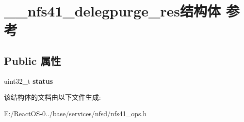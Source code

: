 \hypertarget{struct____nfs41__delegpurge__res}{}\section{\+\_\+\+\_\+nfs41\+\_\+delegpurge\+\_\+res结构体 参考}
\label{struct____nfs41__delegpurge__res}
\subsection*{Public 属性}
\begin{DoxyCompactItemize}
\item 
\mbox{\label{struct____nfs41__delegpurge__res_a3b1cb4cfa00f06890017dfedb71cbcc3}} 
uint32\+\_\+t {\bfseries status}
\end{DoxyCompactItemize}


该结构体的文档由以下文件生成\+:\begin{DoxyCompactItemize}
\item 
E\+:/\+React\+O\+S-\/0../base/services/nfsd/nfs41\+\_\+ops.\+h\end{DoxyCompactItemize}
